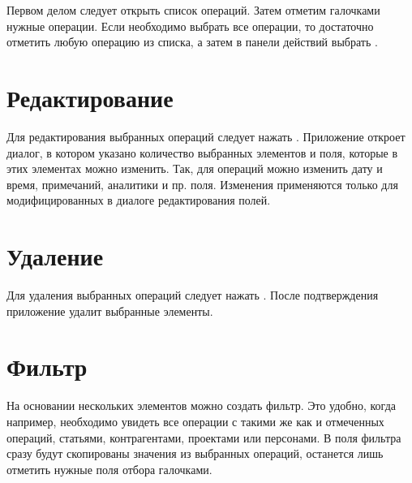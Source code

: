\documentclass[a4paper,10pt,russian]{sphinxmanual}
\begin{document}
\noindent{}

\noindent{}

Первом делом следует открыть список операций. Затем отметим галочками нужные операции. Если необходимо выбрать все
операции, то достаточно отметить любую операцию из списка, а затем в панели действий выбрать .


\section{Редактирование}
\label{\detokenize{bulk-actions:id3}}
Для редактирования выбранных операций следует нажать . Приложение откроет диалог, в котором
указано количество выбранных элементов и поля, которые в этих элементах можно изменить. Так, для операций можно изменить
дату и время, примечаний, аналитики и пр. поля. Изменения применяются только для модифицированных в диалоге редактирования
полей.

\noindent{}

\noindent{}


\section{Удаление}
\label{\detokenize{bulk-actions:id4}}
Для удаления выбранных операций следует нажать . После подтверждения приложение удалит выбранные элементы.

\noindent{}

\noindent{}


\section{Фильтр}
\label{\detokenize{bulk-actions:id5}}
На основании нескольких элементов можно создать фильтр. Это удобно, когда например, необходимо увидеть все операции с
такими же как и отмеченных операций, статьями, контрагентами, проектами или персонами. В поля фильтра сразу будут скопированы
значения из выбранных операций, останется лишь отметить нужные поля отбора галочками.
\end{document}
